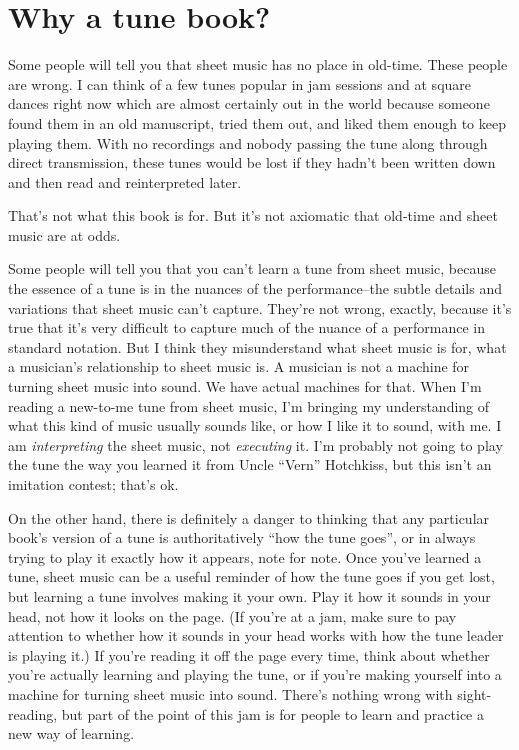 \section*{Why a tune book?}

Some people will tell you that sheet music has no place in
old-time. These people are wrong. I can think of a few tunes popular
in jam sessions and at square dances right now which are almost
certainly out in the world because someone found them in an old
manuscript, tried them out, and liked them enough to keep playing
them. With no recordings and nobody passing the tune along through
direct transmission, these tunes would be lost if they hadn't been
written down and then read and reinterpreted later.

That's not what this book is for. But it's not axiomatic that old-time
and sheet music are at odds.

Some people will tell you that you can't learn a tune from sheet
music, because the essence of a tune is in the nuances of the
performance--the subtle details and variations that sheet music can't
capture. They're not wrong, exactly, because it's true that it's very
difficult to capture much of the nuance of a performance in standard
notation. But I think they misunderstand what sheet music is for, what
a musician's relationship to sheet music is. A musician is not a
machine for turning sheet music into sound. We have actual machines
for that. When I'm reading a new-to-me tune from sheet music, I'm
bringing my understanding of what this kind of music usually sounds
like, or how I like it to sound, with me. I am \emph{interpreting} the
sheet music, not \emph{executing} it. I'm probably not going to play
the tune the way you learned it from Uncle ``Vern'' Hotchkiss, but
this isn't an imitation contest; that's ok.

On the other hand, there is definitely a danger to thinking that any
particular book's version of a tune is authoritatively ``how the tune
goes'', or in always trying to play it exactly how it appears, note
for note. Once you've learned a tune, sheet music can be a useful
reminder of how the tune goes if you get lost, but learning a tune
involves making it your own. Play it how it sounds in your head, not
how it looks on the page. (If you're at a jam, make sure to pay
attention to whether how it sounds in your head works with how the
tune leader is playing it.)  If you're reading it off the page every
time, think about whether you're actually learning and playing the
tune, or if you're making yourself into a machine for turning sheet
music into sound. There's nothing wrong with sight-reading, but part
of the point of this jam is for people to learn and practice a new way
of learning.

